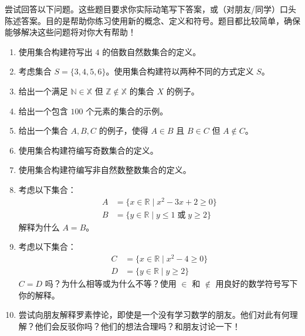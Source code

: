 尝试回答以下问题。这些题目要求你实际动笔写下答案，或（对朋友/同学）口头陈述答案。目的是帮助你练习使用新的概念、定义和符号。题目都比较简单，确保能够解决这些问题将对你大有帮助！

\begin{enumerate}[label=(\arabic*)]
    \item 使用集合构建符写出 $4$ 的倍数自然数集合的定义。
    \item 考虑集合 $S = \{3, 4, 5, 6\}$。使用集合构建符以两种不同的方式定义 $S$。
    \item 给出一个满足 $\mathbb{N} \in \mathbb{X}$ 但 $\mathbb{Z} \notin \mathbb{X}$ 的集合 $X$ 的例子。
    \item 给出一个包含 $100$ 个元素的集合的示例。
    \item 给出一个集合 $A, B, C$ 的例子，使得 $A \in B$ 且 $B \in C$ 但 $A \notin C$。
    \item 使用集合构建符编写奇数集合的定义。
    \item 使用集合构建符编写非自然数整数集合的定义。
    \item 考虑以下集合：
        \begin{align*}
            A &= \{x \in \mathbb{R} \mid x^2 - 3x + 2 \ge 0\} \\
            B &= \{y \in \mathbb{R} \mid y \le 1 \;\text{或}\; y \ge 2\}
        \end{align*}
        解释为什么 $A=B$。
    \item 考虑以下集合：
        \begin{align*}
            C &= \{x \in \mathbb{R} \mid x^2 - 4 \ge 0\} \\
            D &= \{y \in \mathbb{R} \mid y \ge 2\}
        \end{align*}
        $C = D$ 吗？为什么相等或为什么不等？使用 $\in$ 和 $\notin$ 用良好的数学符号写下你的解释。
    \item 尝试向朋友解释罗素悖论，即使是一个没有学习数学的朋友。他们对此有何理解？他们会反驳你吗？他们的想法合理吗？和朋友讨论一下！
\end{enumerate}